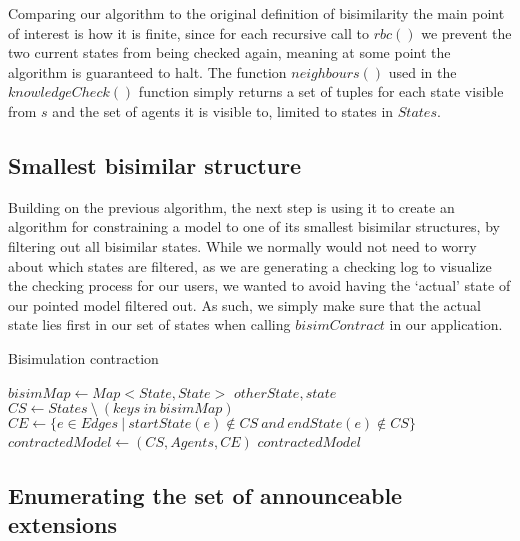 Comparing our algorithm to the original definition of bisimilarity the main point of interest is how it is finite, since for each recursive call to $rbc()$ we prevent the two current states from being checked again, meaning at some point the algorithm is guaranteed to halt. The function $neighbours()$ used in the $knowledgeCheck()$ function simply returns a set of tuples for each state visible from $s$ and the set of agents it is visible to, limited to states in $States$.

\subsection{Smallest bisimilar structure}

Building on the previous algorithm, the next step is using it to create an algorithm for constraining a model to one of its smallest bisimilar structures, by filtering out all bisimilar states. While we normally would not need to worry about which states are filtered, as we are generating a checking log to visualize the checking process for our users, we wanted to avoid having the `actual' state of our pointed model filtered out. As such, we simply make sure that the actual state lies first in our set of states when calling $bisimContract$ in our application. 

\begin{algorithm}
	\caption{Bisimulation contraction}
	\label{alg:bisimContract}
	\begin{algorithmic}
			\State $bisimMap \gets Map<State, State>$
						\State {} {$otherState, state$}
					\EndIf
				\EndFor
			\EndFor
			\State $CS \gets States \ \setminus \ (keys \ in \ bisimMap)$
			\State $CE \gets \{ e \in Edges ~|~ startState(e) \not\in CS \ and \ endState(e) \not\in CS\}$
			\State $contractedModel \gets (CS, Agents, CE)$
			\State \Return $contractedModel$
		\EndFunction
	\end{algorithmic}
\end{algorithm}

\subsection{Enumerating the set of announceable extensions}

